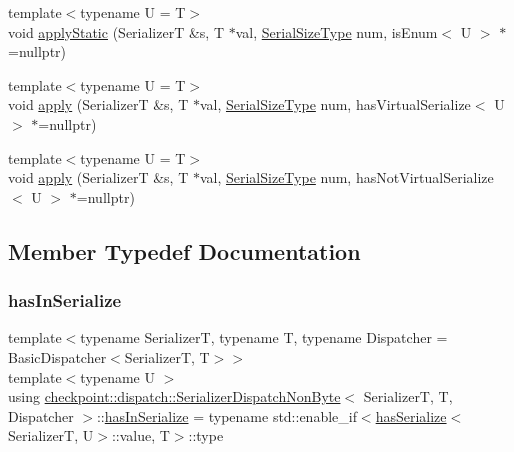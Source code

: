 \begin{DoxyCompactItemize}
\item 
{\footnotesize template$<$typename U  = T$>$ }\\void \hyperlink{structcheckpoint_1_1dispatch_1_1_serializer_dispatch_non_byte_a0aec94a0c69c27fc13f6dc0f923d2f50}{apply\+Static} (SerializerT \&s, T $\ast$val, \hyperlink{namespacecheckpoint_a083f6674da3f94c2901b18c6d238217c}{Serial\+Size\+Type} num, is\+Enum$<$ U $>$ $\ast$=nullptr)
\item 
{\footnotesize template$<$typename U  = T$>$ }\\void \hyperlink{structcheckpoint_1_1dispatch_1_1_serializer_dispatch_non_byte_a12e7e180be642ec9eaaac93972e28856}{apply} (SerializerT \&s, T $\ast$val, \hyperlink{namespacecheckpoint_a083f6674da3f94c2901b18c6d238217c}{Serial\+Size\+Type} num, has\+Virtual\+Serialize$<$ U $>$ $\ast$=nullptr)
\item 
{\footnotesize template$<$typename U  = T$>$ }\\void \hyperlink{structcheckpoint_1_1dispatch_1_1_serializer_dispatch_non_byte_ae6e291caec4d650a7d91e78a209a1964}{apply} (SerializerT \&s, T $\ast$val, \hyperlink{namespacecheckpoint_a083f6674da3f94c2901b18c6d238217c}{Serial\+Size\+Type} num, has\+Not\+Virtual\+Serialize$<$ U $>$ $\ast$=nullptr)
\end{DoxyCompactItemize}


\subsection{Member Typedef Documentation}
\mbox{\label{structcheckpoint_1_1dispatch_1_1_serializer_dispatch_non_byte_a7f2203710503e6ea7a5c4a565795a1d0}} 
\subsubsection{\texorpdfstring{has\+In\+Serialize}{hasInSerialize}}
{\footnotesize\ttfamily template$<$typename SerializerT, typename T, typename Dispatcher = Basic\+Dispatcher$<$\+Serializer\+T, T$>$$>$ \\
template$<$typename U $>$ \\
using \hyperlink{structcheckpoint_1_1dispatch_1_1_serializer_dispatch_non_byte}{checkpoint\+::dispatch\+::\+Serializer\+Dispatch\+Non\+Byte}$<$ SerializerT, T, Dispatcher $>$\+::\hyperlink{structcheckpoint_1_1dispatch_1_1_serializer_dispatch_non_byte_a7f2203710503e6ea7a5c4a565795a1d0}{has\+In\+Serialize} =  typename std\+::enable\+\_\+if$<$\hyperlink{structcheckpoint_1_1dispatch_1_1has_serialize}{has\+Serialize}$<$SerializerT, U$>$\+::value, T$>$\+::type}

